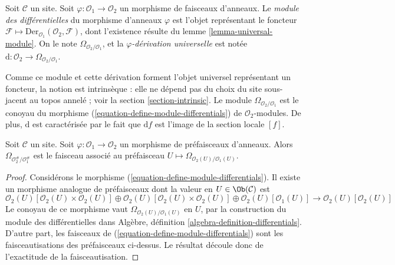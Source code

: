 \begin{definition}

\label{definition-module-differentials}
Soit $\mathcal{C}$ un site. Soit
$\varphi : \mathcal{O}_1 \to \mathcal{O}_2$ un morphisme de faisceaux
d'anneaux. Le {\it module des différentielles} du morphisme d'anneaux
$\varphi$ est l'objet représentant le foncteur
$\mathcal{F} \mapsto \text{Der}_{\mathcal{O}_1}(\mathcal{O}_2, \mathcal{F})$,
dont l'existence résulte du lemme \ref{lemma-universal-module}. On le note
$\Omega_{\mathcal{O}_2/\mathcal{O}_1}$, et la {\it $\varphi$-dérivation
universelle} est notée
$\text{d} : \mathcal{O}_2 \to \Omega_{\mathcal{O}_2/\mathcal{O}_1}$.
\end{definition}

\noindent
Comme ce module et cette dérivation forment l'objet universel représentant un
foncteur, la notion est intrinsèque : elle ne dépend pas du choix du site
sous-jacent au topos annelé ; voir la section \ref{section-intrinsic}. Le
module $\Omega_{\mathcal{O}_2/\mathcal{O}_1}$ est le conoyau du morphisme
(\ref{equation-define-module-differentials}) de $\mathcal{O}_2$-modules. De plus,
$\text{d}$ est caractérisée par le fait que $\text{d}f$ est l'image de la
section locale $[f]$.

\begin{lemma}

\label{lemma-differentials-sheafify}
Soit $\mathcal{C}$ un site. Soit
$\varphi : \mathcal{O}_1 \to \mathcal{O}_2$ un morphisme de préfaisceaux
d'anneaux. Alors $\Omega_{\mathcal{O}_2^\#/\mathcal{O}_1^\#}$ est le
faisceau associé au préfaisceau
$U \mapsto \Omega_{\mathcal{O}_2(U)/\mathcal{O}_1(U)}$.
\end{lemma}

\begin{proof}
Considérons le morphisme (\ref{equation-define-module-differentials}). Il
existe un morphisme analogue de préfaisceaux dont la valeur en
$U \in \Ob(\mathcal{C})$ est
$$
\mathcal{O}_2(U)[\mathcal{O}_2(U) \times \mathcal{O}_2(U)] \oplus
\mathcal{O}_2(U)[\mathcal{O}_2(U) \times \mathcal{O}_2(U)] \oplus
\mathcal{O}_2(U)[\mathcal{O}_1(U)]
\longrightarrow
\mathcal{O}_2(U)[\mathcal{O}_2(U)]
$$
Le conoyau de ce morphisme vaut
$\Omega_{\mathcal{O}_2(U)/\mathcal{O}_1(U)}$ en $U$, par la construction du
module des différentielles dans Algèbre, définition
\ref{algebra-definition-differentials}. D'autre part, les faisceaux de
(\ref{equation-define-module-differentials}) sont les faisceautisations des
préfaisceaux ci-dessus. Le résultat découle donc de l'exactitude de la
faisceautisation.
\end{proof}

